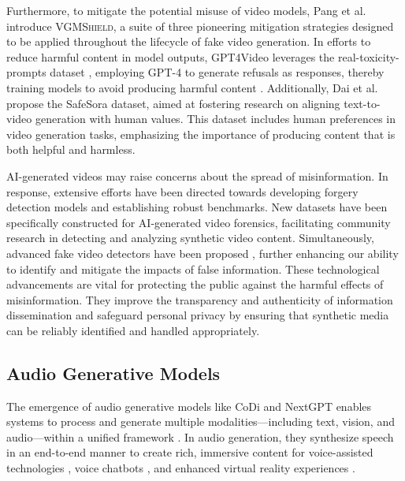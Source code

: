 Furthermore, to mitigate the potential misuse of video models, Pang et al. \cite{pang2024vgmshield} introduce \textsc{VGMShield}, a suite of three pioneering mitigation strategies designed to be applied throughout the lifecycle of fake video generation. In efforts to reduce harmful content in model outputs, GPT4Video leverages the real-toxicity-prompts dataset \cite{gehman2020realtoxicityprompts}, employing GPT-4 to generate refusals as responses, thereby training models to avoid producing harmful content \cite{wang2023gpt4video}. Additionally, Dai et al.  \cite{dai2024safesora} propose the SafeSora dataset, aimed at fostering research on aligning text-to-video generation with human values. This dataset includes human preferences in video generation tasks, emphasizing the importance of producing content that is both helpful and harmless. 

AI-generated videos may raise concerns about the spread of misinformation. In response, extensive efforts have been directed towards developing forgery detection models and establishing robust benchmarks. New datasets \cite{chen2024demamba,he2024exposing} have been specifically constructed for AI-generated video forensics, facilitating community research in detecting and analyzing synthetic video content. Simultaneously, advanced fake video detectors have been proposed \cite{vahdati2024beyond,ma2024decof,chang2024matters,nguyen2024videofact}, further enhancing our ability to identify and mitigate the impacts of false information.
These technological advancements are vital for protecting the public against the harmful effects of misinformation. They improve the transparency and authenticity of information dissemination and safeguard personal privacy by ensuring that synthetic media can be reliably identified and handled appropriately. 

\subsection{Audio Generative Models}
The emergence of audio generative models like CoDi \citep{tang2024codi} and NextGPT \citep{wu2023next} enables systems to process and generate multiple modalities—including text, vision, and audio—within a unified framework \citep{fu2024vita, li2024baichuan, chen2024emova, luo2025openomni}. In audio generation, they synthesize speech in an end-to-end manner to create rich, immersive content for voice-assisted technologies \citep{kulkarni2022speech}, voice chatbots \citep{chen2024voicebench}, and enhanced virtual reality experiences \citep{morotti2020fostering}.

